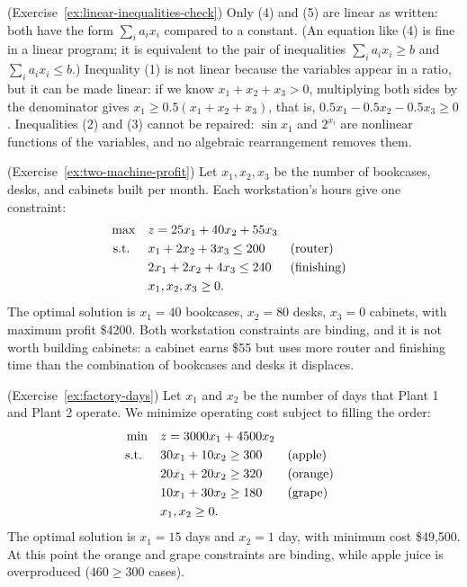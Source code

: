 \begin{solution}(Exercise~\ref{ex:linear-inequalities-check})
Only (4) and (5) are linear as written: both have the form $\sum_i a_i x_i$ compared to a constant.  (An equation like (4) is fine in a linear program; it is equivalent to the pair of inequalities $\sum_i a_i x_i \geq b$ and $\sum_i a_i x_i \leq b$.)
Inequality (1) is not linear because the variables appear in a ratio, but it can be made linear: if we know $x_1 + x_2 + x_3 > 0$, multiplying both sides by the denominator gives $x_1 \geq 0.5(x_1 + x_2 + x_3)$, that is, $0.5x_1 - 0.5x_2 - 0.5x_3 \geq 0$.
Inequalities (2) and (3) cannot be repaired: $\sin x_1$ and $2^{x_i}$ are nonlinear functions of the variables, and no algebraic rearrangement removes them.
\end{solution}

\begin{solution}(Exercise~\ref{ex:two-machine-profit})
Let $x_1, x_2, x_3$ be the number of bookcases, desks, and cabinets built per month.  Each workstation's hours give one constraint:
\begin{align*}
\max \quad & z = 25x_1 + 40x_2 + 55x_3\\
\text{ s.t. } \quad & x_1 + 2x_2 + 3x_3 \leq 200 && \text{(router)}\\
& 2x_1 + 2x_2 + 4x_3 \leq 240 && \text{(finishing)}\\
& x_1, x_2, x_3 \geq 0.
\end{align*}
The optimal solution is $x_1 = 40$ bookcases, $x_2 = 80$ desks, $x_3 = 0$ cabinets, with maximum profit \$4200.  Both workstation constraints are binding, and it is not worth building cabinets: a cabinet earns \$55 but uses more router and finishing time than the combination of bookcases and desks it displaces.
\end{solution}

\begin{solution}(Exercise~\ref{ex:factory-days})
Let $x_1$ and $x_2$ be the number of days that Plant 1 and Plant 2 operate.  We minimize operating cost subject to filling the order:
\begin{align*}
\min \quad & z = 3000x_1 + 4500x_2\\
\text{ s.t. } \quad & 30x_1 + 10x_2 \geq 300 && \text{(apple)}\\
& 20x_1 + 20x_2 \geq 320 && \text{(orange)}\\
& 10x_1 + 30x_2 \geq 180 && \text{(grape)}\\
& x_1, x_2 \geq 0.
\end{align*}
The optimal solution is $x_1 = 15$ days and $x_2 = 1$ day, with minimum cost \$49{,}500.  At this point the orange and grape constraints are binding, while apple juice is overproduced ($460 \geq 300$ cases).
\end{solution}

